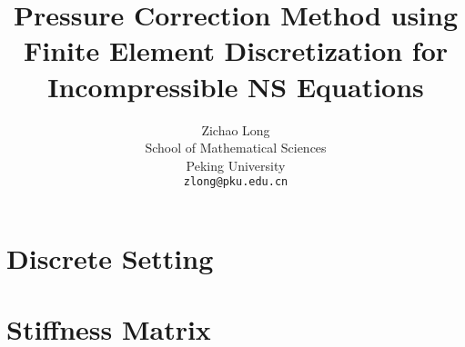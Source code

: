 \documentclass{article}
\title{Pressure Correction Method using Finite Element Discretization for Incompressible NS Equations}
\author{
  Zichao Long \\
  School of Mathematical Sciences \\
  Peking University\\
  \texttt{zlong@pku.edu.cn}
}
\begin{document}
\maketitle




\section{Discrete Setting}




\section{Stiffness Matrix}



% 










  

\end{document}
